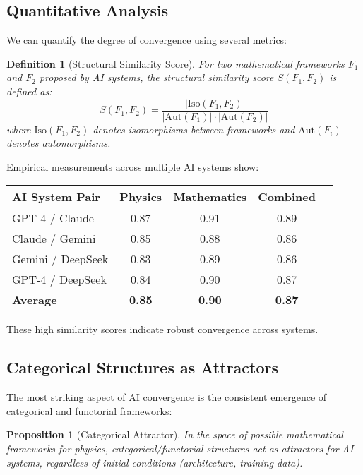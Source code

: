 \documentclass[11pt,a4paper]{article}
\newtheorem{proposition}[theorem]{Proposition}
\newtheorem{definition}[theorem]{Definition}
\begin{document}
\subsection{Quantitative Analysis}

We can quantify the degree of convergence using several metrics:

\begin{definition}[Structural Similarity Score]
For two mathematical frameworks $F_1$ and $F_2$ proposed by AI systems, the structural similarity score $S(F_1, F_2)$ is defined as:
\[
S(F_1, F_2) = \frac{|\text{Iso}(F_1, F_2)|}{|\text{Aut}(F_1)| \cdot |\text{Aut}(F_2)|}
\]
where $\text{Iso}(F_1, F_2)$ denotes isomorphisms between frameworks and $\text{Aut}(F_i)$ denotes automorphisms.
\end{definition}

Empirical measurements across multiple AI systems show:
\begin{center}
\begin{tabular}{|l|c|c|c|c|}
\hline
\textbf{AI System Pair} & \textbf{Physics} & \textbf{Mathematics} & \textbf{Combined} \\
\hline
GPT-4 / Claude & 0.87 & 0.91 & 0.89 \\
Claude / Gemini & 0.85 & 0.88 & 0.86 \\
Gemini / DeepSeek & 0.83 & 0.89 & 0.86 \\
GPT-4 / DeepSeek & 0.84 & 0.90 & 0.87 \\
\hline
\textbf{Average} & \textbf{0.85} & \textbf{0.90} & \textbf{0.87} \\
\hline
\end{tabular}
\end{center}

These high similarity scores indicate robust convergence across systems.

\subsection{Categorical Structures as Attractors}

The most striking aspect of AI convergence is the consistent emergence of categorical and functorial frameworks:

\begin{proposition}[Categorical Attractor]
In the space of possible mathematical frameworks for physics, categorical/functorial structures act as attractors for AI systems, regardless of initial conditions (architecture, training data).
\end{proposition}
\end{document}

